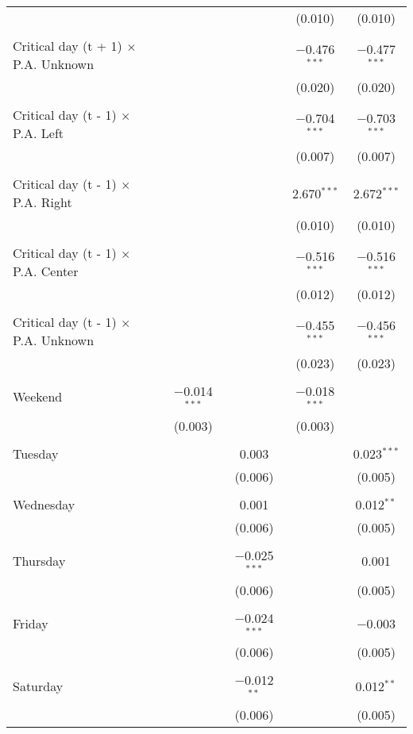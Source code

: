 \documentclass[
]{article}
\begin{document}
\begin{table}[!htbp]
{\begin{tabular}{@{\extracolsep{5pt}}lcccc}
  &  &  & (0.010) & (0.010) \\ 
  & & & & \\ 
 Critical day (t + 1) $\times$ P.A. Unknown &  &  & $-$0.476$^{***}$ & $-$0.477$^{***}$ \\ 
  &  &  & (0.020) & (0.020) \\ 
  & & & & \\ 
 Critical day (t - 1) $\times$ P.A. Left &  &  & $-$0.704$^{***}$ & $-$0.703$^{***}$ \\ 
  &  &  & (0.007) & (0.007) \\ 
  & & & & \\ 
 Critical day (t - 1) $\times$ P.A. Right &  &  & 2.670$^{***}$ & 2.672$^{***}$ \\ 
  &  &  & (0.010) & (0.010) \\ 
  & & & & \\ 
 Critical day (t - 1) $\times$ P.A. Center &  &  & $-$0.516$^{***}$ & $-$0.516$^{***}$ \\ 
  &  &  & (0.012) & (0.012) \\ 
  & & & & \\ 
 Critical day (t - 1) $\times$ P.A. Unknown &  &  & $-$0.455$^{***}$ & $-$0.456$^{***}$ \\ 
  &  &  & (0.023) & (0.023) \\ 
  & & & & \\ 
 Weekend & $-$0.014$^{***}$ &  & $-$0.018$^{***}$ &  \\ 
  & (0.003) &  & (0.003) &  \\ 
  & & & & \\ 
 Tuesday &  & 0.003 &  & 0.023$^{***}$ \\ 
  &  & (0.006) &  & (0.005) \\ 
  & & & & \\ 
 Wednesday &  & 0.001 &  & 0.012$^{**}$ \\ 
  &  & (0.006) &  & (0.005) \\ 
  & & & & \\ 
 Thursday &  & $-$0.025$^{***}$ &  & 0.001 \\ 
  &  & (0.006) &  & (0.005) \\ 
  & & & & \\ 
 Friday &  & $-$0.024$^{***}$ &  & $-$0.003 \\ 
  &  & (0.006) &  & (0.005) \\ 
  & & & & \\ 
 Saturday &  & $-$0.012$^{**}$ &  & 0.012$^{**}$ \\ 
  &  & (0.006) &  & (0.005) \\ 

\end{tabular}}
\end{table}
\end{document}
